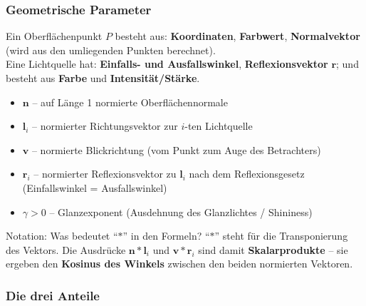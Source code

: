 \documentclass[12pt, a4paper]{article}
\begin{document}
\subsubsection*{Geometrische Parameter}

Ein Oberflächenpunkt $P$ besteht aus: \textbf{Koordinaten}, \textbf{Farbwert}, \textbf{Normalvektor} (wird aus den umliegenden Punkten berechnet).\\
Eine Lichtquelle hat: \textbf{Einfalls- und Ausfallswinkel}, \textbf{Reflexionsvektor} $\mathbf{r}$; und besteht aus \textbf{Farbe} und \textbf{Intensität/Stärke}.

\begin{itemize}
  \item $\mathbf{n}$ -- auf Länge 1 normierte Oberflächennormale
  \item $\mathbf{l}_i$ -- normierter Richtungsvektor zur $i$-ten Lichtquelle
  \item $\mathbf{v}$ -- normierte Blickrichtung (vom Punkt zum Auge des Betrachters)
  \item $\mathbf{r}_i$ -- normierter Reflexionsvektor zu $\mathbf{l}_i$ nach dem Reflexionsgesetz (Einfallswinkel = Ausfallswinkel)
  \item $\gamma > 0$ -- Glanzexponent (Ausdehnung des Glanzlichtes / Shininess)
\end{itemize}

\begin{notebox}{Notation: Was bedeutet ``$\ast$'' in den Formeln?}
``$\ast$'' steht für die Transponierung des Vektors. Die Ausdrücke $\mathbf{n} \ast \mathbf{l}_i$ und $\mathbf{v} \ast \mathbf{r}_i$ sind damit \textbf{Skalarprodukte} -- sie ergeben den \textbf{Kosinus des Winkels} zwischen den beiden normierten Vektoren.
\end{notebox}

\subsubsection*{Die drei Anteile}
\end{document}
